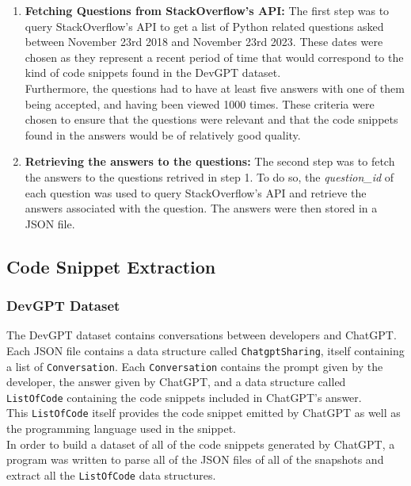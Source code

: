 \begin{enumerate}
    \item \textbf{Fetching Questions from StackOverflow's API:} The first step was to query StackOverflow's API to get a list of Python related questions asked between November 23rd 2018 and November 23rd 2023. These dates were chosen as they represent a recent period of time that would correspond to the kind of code snippets found in the DevGPT dataset. \\

          Furthermore, the questions had to have at least five answers with one of them being accepted, and having been viewed 1000 times. These criteria were chosen to ensure that the questions were relevant and that the code snippets found in the answers would be of relatively good quality.\\

    \item \textbf{Retrieving the answers to the questions:} The second step was to fetch the answers to the questions retrived in step 1. To do so, the \textit{question\_id} of each question was used to query StackOverflow's API and retrieve the answers associated with the question. The answers were then stored in a JSON file.

\end{enumerate}

\subsection{Code Snippet Extraction}
\subsubsection{DevGPT Dataset}
The DevGPT dataset contains conversations between developers and ChatGPT. Each JSON file contains a data structure called \texttt{ChatgptSharing}, itself containing a list of \texttt{Conversation}. Each \texttt{Conversation} contains the prompt given by the developer, the answer given by ChatGPT, and a data structure called \texttt{ListOfCode} containing the code snippets included in ChatGPT's answer. \\

This \texttt{ListOfCode} itself provides the code snippet emitted by ChatGPT as well as the programming language used in the snippet. \\

In order to build a dataset of all of the code snippets generated by ChatGPT, a program was written to parse all of the JSON files of all of the snapshots and extract all the \texttt{ListOfCode} data structures. \\

